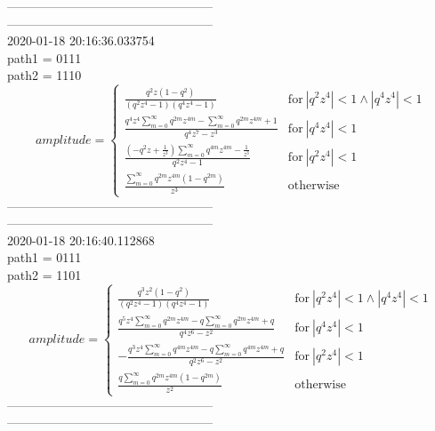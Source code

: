 --------------------------------------------------\\
--------------------------------------------------\\
2020-01-18 20:16:36.033754\\
path1 = 0111\\
path2 = 1110\\
$$amplitude = \begin{cases} \frac{q^{2} z \left(1 - q^{2}\right)}{\left(q^{2} z^{4} - 1\right) \left(q^{4} z^{4} - 1\right)} & \text{for}\: \left|{q^{2} z^{4}}\right| < 1 \wedge \left|{q^{4} z^{4}}\right| < 1 \\\frac{q^{4} z^{4} \sum_{m=0}^{\infty} q^{2 m} z^{4 m} - \sum_{m=0}^{\infty} q^{2 m} z^{4 m} + 1}{q^{4} z^{7} - z^{3}} & \text{for}\: \left|{q^{4} z^{4}}\right| < 1 \\\frac{\left(- q^{2} z + \frac{1}{z^{3}}\right) \sum_{m=0}^{\infty} q^{4 m} z^{4 m} - \frac{1}{z^{3}}}{q^{2} z^{4} - 1} & \text{for}\: \left|{q^{2} z^{4}}\right| < 1 \\\frac{\sum_{m=0}^{\infty} q^{2 m} z^{4 m} \left(1 - q^{2 m}\right)}{z^{3}} & \text{otherwise} \end{cases}$$
--------------------------------------------------\\
--------------------------------------------------\\
2020-01-18 20:16:40.112868\\
path1 = 0111\\
path2 = 1101\\
$$amplitude = \begin{cases} \frac{q^{3} z^{2} \left(1 - q^{2}\right)}{\left(q^{2} z^{4} - 1\right) \left(q^{4} z^{4} - 1\right)} & \text{for}\: \left|{q^{2} z^{4}}\right| < 1 \wedge \left|{q^{4} z^{4}}\right| < 1 \\\frac{q^{5} z^{4} \sum_{m=0}^{\infty} q^{2 m} z^{4 m} - q \sum_{m=0}^{\infty} q^{2 m} z^{4 m} + q}{q^{4} z^{6} - z^{2}} & \text{for}\: \left|{q^{4} z^{4}}\right| < 1 \\- \frac{q^{3} z^{4} \sum_{m=0}^{\infty} q^{4 m} z^{4 m} - q \sum_{m=0}^{\infty} q^{4 m} z^{4 m} + q}{q^{2} z^{6} - z^{2}} & \text{for}\: \left|{q^{2} z^{4}}\right| < 1 \\\frac{q \sum_{m=0}^{\infty} q^{2 m} z^{4 m} \left(1 - q^{2 m}\right)}{z^{2}} & \text{otherwise} \end{cases}$$
--------------------------------------------------\\
--------------------------------------------------\\
